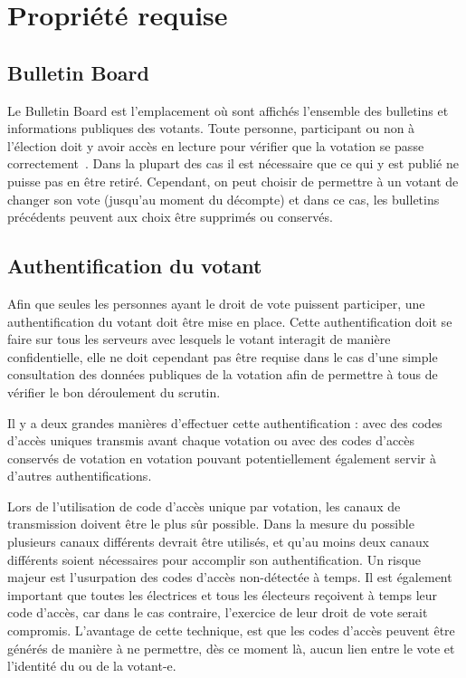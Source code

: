 \documentclass[../report]{subfiles}
\begin{document}
\chapter{Propriété requise}
\section{Bulletin Board}

Le Bulletin Board est l'emplacement où sont affichés l'ensemble des bulletins et informations publiques des votants. 
Toute personne, participant ou non à l'élection doit y avoir accès en lecture pour vérifier que la votation se passe correctement~\cite{gharadaghy_verifiability_2010}.
Dans la plupart des cas il est nécessaire que ce qui y est publié ne puisse pas en être retiré.
Cependant, on peut choisir de permettre à un votant de changer son vote (jusqu'au moment du décompte) et dans ce cas, les bulletins précédents 
peuvent aux choix être supprimés ou conservés.

\section{Authentification du votant}

Afin que seules les personnes ayant le droit de vote puissent participer, une authentification du votant doit être mise en place.
Cette authentification doit se faire sur tous les serveurs avec lesquels le votant interagit de manière confidentielle, elle ne doit
cependant pas être requise dans le cas d'une simple consultation des données publiques de la votation afin de permettre à tous de vérifier
le bon déroulement du scrutin.

Il y a deux grandes manières d'effectuer cette authentification : avec des codes d'accès uniques transmis avant chaque votation ou avec des codes d'accès
conservés de votation en votation pouvant potentiellement également servir à d'autres authentifications.

Lors de l'utilisation de code d'accès unique par votation, les canaux de transmission doivent être le plus sûr possible.
Dans la mesure du possible plusieurs canaux différents devrait être utilisés, et qu'au moins deux canaux différents soient nécessaires pour accomplir son authentification.
Un risque majeur est l'usurpation des codes d'accès non-détectée à temps.
Il est également important que toutes les électrices et tous les électeurs reçoivent à temps leur code d'accès, car dans le cas contraire, l'exercice de leur droit de vote serait compromis.
L'avantage de cette technique, est que les codes d'accès peuvent être générés de manière à ne permettre, dès ce moment là, aucun lien entre le vote
et l'identité du ou de la votant-e.
\end{document}
